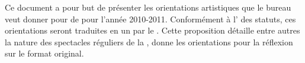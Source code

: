 Ce document a pour but de présenter les orientations artistiques que le bureau veut donner pour \troupe{} de \meta{} pour l'année 2010-2011. Conformément à l' des statuts, ces orientations seront traduites en un \PA{} par le \DA{}. Cette proposition détaille entre autres la nature des spectacles réguliers de la \troupe{}, donne les orientations pour la réflexion sur le format original.